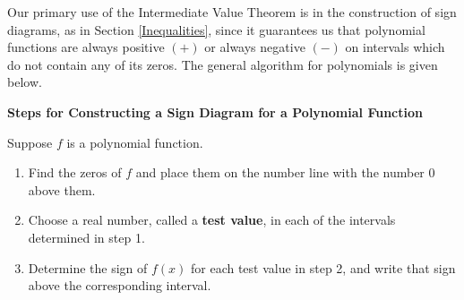 Our primary use of the Intermediate Value Theorem is in the construction of sign diagrams, as in Section \ref{Inequalities}, since it guarantees us that polynomial functions are always positive $(+)$ or always negative $(-)$ on intervals which do not contain any of its zeros.  The general algorithm for polynomials is given below.

\smallskip
\colorbox{ResultColor}{\bbm

\centerline{\textbf{Steps for Constructing a Sign Diagram for a Polynomial Function}}

\smallskip

\hspace{.17in} Suppose $f$ is a polynomial function. 

\begin{enumerate}

\item  Find the zeros of $f$ and place them on the number line with the number $0$ above them.

\item  Choose a real number, called a \textbf{test value}, in each of the intervals determined in step 1. 

\item  Determine the sign of $f(x)$ for each test value in step 2, and write that sign above the corresponding interval.

\end{enumerate}

\ebm}
\smallskip 

